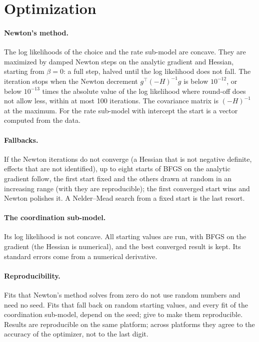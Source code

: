 \section{Optimization}\label{sec:technewton}

\paragraph{Newton's method.} The log likelihoods of the choice and the rate sub-model are concave. They are maximized by damped Newton steps on the analytic gradient and Hessian, starting from $\beta=0$: a full step, halved until the log likelihood does not fall. The iteration stops when the Newton decrement $g^{\top}(-H)^{-1}g$ is below $10^{-12}$, or below $10^{-13}$ times the absolute value of the log likelihood where round-off does not allow less, within at most 100 iterations. The covariance matrix is $(-H)^{-1}$ at the maximum. For the rate sub-model with intercept the start is a vector computed from the data.

\paragraph{Fallbacks.} If the Newton iterations do not converge (a Hessian that is not negative definite, effects that are not identified), up to eight starts of BFGS on the analytic gradient follow, the first start fixed and the others drawn at random in an increasing range (with  they are reproducible); the first converged start wins and Newton polishes it. A Nelder--Mead search from a fixed start is the last resort.

\paragraph{The coordination sub-model.} Its log likelihood is not concave. All starting values are run, with BFGS on the gradient (the Hessian is numerical), and the best converged result is kept. Its standard errors come from a numerical derivative.

\paragraph{Reproducibility.} Fits that Newton's method solves from zero do not use random numbers and need no seed. Fits that fall back on random starting values, and every fit of the coordination sub-model, depend on the seed; give  to make them reproducible. Results are reproducible on the same platform; across platforms they agree to the accuracy of the optimizer, not to the last digit.

